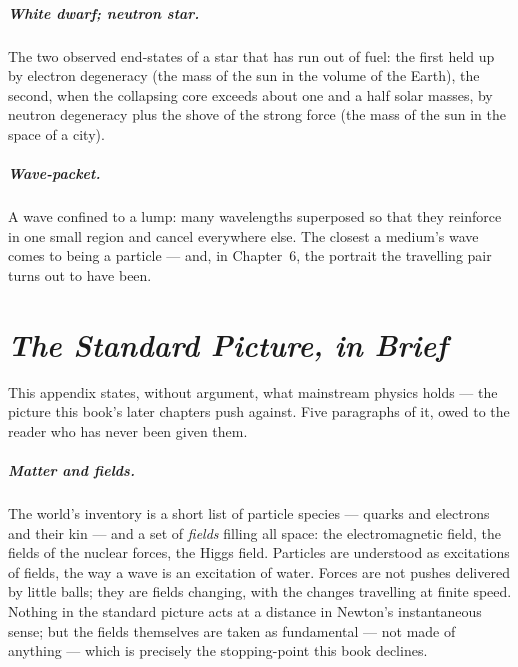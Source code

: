 \documentclass[fontsize=11pt,paper=a4,pagesize=auto,parskip=half-]{scrbook}
\begin{document}
\paragraph{White dwarf; neutron star.} The two observed end-states of a star that has run out of fuel: the first held up by electron degeneracy (the mass of the sun in the volume of the Earth), the second, when the collapsing core exceeds about one and a half solar masses, by neutron degeneracy plus the shove of the strong force (the mass of the sun in the space of a city).

\paragraph{Wave-packet.} A wave confined to a lump: many wavelengths superposed so that they reinforce in one small region and cancel everywhere else. The closest a medium's wave comes to being a particle --- and, in Chapter~6, the portrait the travelling pair turns out to have been.

\chapter{\emph{The Standard Picture, in Brief}}

This appendix states, without argument, what mainstream physics holds --- the picture this book's later chapters push against. Five paragraphs of it, owed to the reader who has never been given them.

\paragraph{Matter and fields.} The world's inventory is a short list of particle species --- quarks and electrons and their kin --- and a set of \emph{fields} filling all space: the electromagnetic field, the fields of the nuclear forces, the Higgs field. Particles are understood as excitations of fields, the way a wave is an excitation of water. Forces are not pushes delivered by little balls; they are fields changing, with the changes travelling at finite speed. Nothing in the standard picture acts at a distance in Newton's instantaneous sense; but the fields themselves are taken as fundamental --- not made of anything --- which is precisely the stopping-point this book declines.
\end{document}
